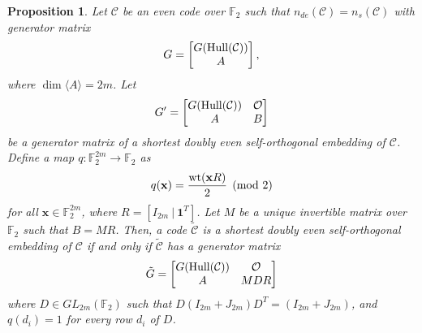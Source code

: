 \documentclass{article}
\newtheorem{proposition}[theorem]{Proposition}
\theoremstyle{definition}
\theoremstyle{remark}
\begin{document}
\begin{proposition}\label{evenalg}
    Let $\mathcal{C}$ be an even code over $\mathbb{F}_2$ such that $n_{de}(\mathcal{C})=n_s(\mathcal{C})$ with generator matrix
    \[
    G=\begin{bmatrix}
        G({\rm Hull}(\mathcal{C}))\\A
    \end{bmatrix},
    \]
    where $\dim\langle A\rangle=2m$. Let
    \[
    G'=\begin{bmatrix}
       G({\rm Hull}(\mathcal{C})) & \mathcal{O}\\A & B
    \end{bmatrix}
    \]
    be a generator matrix of a shortest doubly even self-orthogonal embedding of $\mathcal{C}$. Define a map $q:\mathbb{F}_2^{2m}\to\mathbb{F}_2$ as
    \[
    q(\mathbf{x})=\frac{{\rm wt}(\mathbf{x}R)}{2}\pmod 2
    \]
    for all $\mathbf{x}\in\mathbb{F}_2^{2m}$, where $R=[I_{2m}~|~\mathbf{1}^T]$. Let $M$ be a unique invertible matrix over $\mathbb{F}_2$ such that $B=MR$. Then, a code $\tilde{\mathcal{C}}$ is a shortest doubly even self-orthogonal embedding of $\mathcal{C}$ if and only if $\tilde{\mathcal{C}}$ has a generator matrix
    \[
    \tilde{G}=\begin{bmatrix}
    G({\rm Hull}(\mathcal{C})) & \mathcal{O}\\A & MDR
    \end{bmatrix}
    \]
    where $D\in GL_{2m}(\mathbb{F}_2)$ such that $D(I_{2m}+J_{2m})D^T=(I_{2m}+J_{2m})$, and $q(d_i)=1$ for every row $d_i$ of $D$.
\end{proposition}
\end{document}
